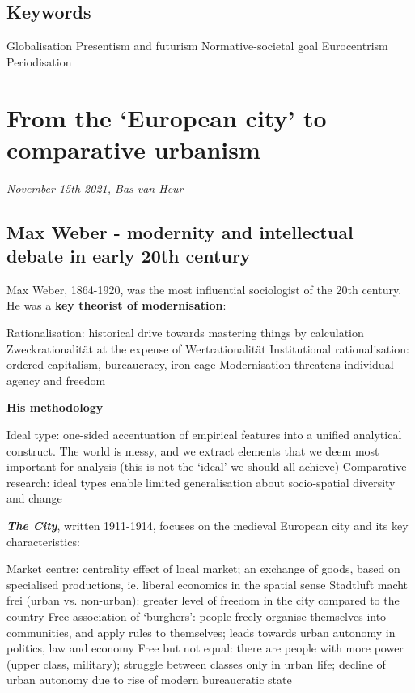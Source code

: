 \documentclass{article}
\begin{document}
\subsection{Keywords}

Globalisation
Presentism and futurism
Normative-societal goal
Eurocentrism
Periodisation


\section{From the `European city' to comparative urbanism}
\textit{November 15th 2021, Bas van Heur}

\subsection{Max Weber - modernity and intellectual debate in early 20th century}

Max Weber, 1864-1920, was the most influential sociologist of the 20th century.
He was a \textbf{key theorist of modernisation}:

\begin{outline}
	\1 Rationalisation: historical drive towards mastering things by calculation
	\1 Zweckrationalität at the expense of Wertrationalität
	\1 Institutional rationalisation: ordered capitalism, bureaucracy, iron cage
	\1 Modernisation threatens individual agency and freedom
\end{outline}

\textbf{His methodology}
\begin{outline}
	\1 Ideal type: one-sided accentuation of empirical features into a unified analytical construct. The world is messy, and we extract elements that we deem most important for analysis (this is not the `ideal' we should all achieve)
	\1 Comparative research: ideal types enable limited generalisation about socio-spatial diversity and change
\end{outline}

\textbf{\textit{The City}}, written 1911-1914, focuses on the medieval European city and its key characteristics:
\begin{outline}
	\1 Market centre: centrality effect of local market; an exchange of goods, based on specialised productions, ie. liberal economics in the spatial sense
	\1 Stadtluft macht frei (urban vs. non-urban): greater level of freedom in the city compared to the country
	\1 Free association of `burghers': people freely organise themselves into communities, and apply rules to themselves; leads towards urban autonomy in politics, law and economy
	\1 Free but not equal: there are people with more power (upper class, military); struggle between classes only in urban life; decline of urban autonomy due to rise of modern bureaucratic state
\end{outline}
\end{document}
